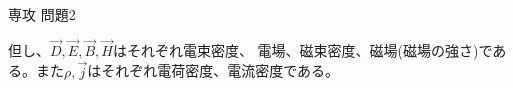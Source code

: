 \documentclass[fleqn]{jbook}
\begin{document}
\begin{question}{専攻 問題2}{}
\begin{minipage}{60mm}
\end{minipage}%
\begin{minipage}{110mm}
  \begin{center}
  \end{center}
\end{minipage}

但し、$\vec{D},\vec{E},\vec{B},\vec{H}$はそれぞれ電束密度、
電場、磁束密度、磁場(磁場の強さ)である。また$\rho,
\vec{j}$はそれぞれ電荷密度、電流密度である。\\

\end{question}
\end{document}
